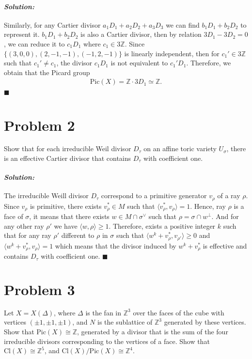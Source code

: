 \documentclass[12pt, a4paper]{article}
\newenvironment{solution}
  {\paragraph{\textit{Solution:}}\par\medskip}
  {\hfill$\blacksquare$\vspace{0.1cm}}
\begin{document}
\begin{solution}
Similarly, for any Cartier divisor $a_1D_1+a_2D_2+a_3D_3$ we can find $b_1D_1+b_2D_2$ to represent it.
$b_1D_1+b_2D_2$ is also a Cartier divisor, then by relation $3D_1-3D_2=0$, we can reduce it to $c_1D_1$ where $c_1\in 3\mathbb{Z}$.
Since $\{(3,0,0),(2,-1,-1),(-1,2,-1)\}$ is linearly independent, then for $c_1'\in 3\mathbb{Z}$ such that $c_1'\neq c_1$, the divisor $c_1D_1$ is not equivalent to 
$c_1'D_1$. Therefore, we obtain that the Picard group 
\begin{align*}
    \text{Pic}(X) =\mathbb{Z} \cdot 3D_1 \simeq \mathbb{Z}.
\end{align*}
\end{solution}


\section*{Problem 2}
Show that for each irreducible Weil divisor $D_\tau$ on an affine toric variety $U_\sigma$, there is an effective Cartier divisor that contains $D_\tau$ with coefficient one.
\begin{solution}
    The irreducible Weill divisor $D_\tau$ correspond to a primitive generator $v_\rho$ of a ray $\rho$.
    Since $v_\rho$ is primitive, there exists $v_\rho^*\in M$ such that $\langle v_\rho^*,v_\rho \rangle=1$.
    Hence, ray $\rho$ is a face of $\sigma$, it means that there exists $w\in M\cap \sigma^\vee$ such that $\rho = \sigma\cap w^{\perp}$.
    And for any other ray $\rho'$ we have $\langle w,\rho \rangle\ge 1$. Therefore, exists a positive integer $k$ such that for any ray $\rho'$ different to $\rho$ in $\sigma$ such that $\langle w^k+v_\rho^*,v_{\rho'} \rangle\ge 0$ 
    and $\langle w^k+v_\rho^*,v_{\rho} \rangle = 1$ which means that the divisor induced by $w^k+v_\rho^*$ is effective and contains $D_\tau$ with coefficient one.
\end{solution}




\section*{Problem 3}
Let $X = X(\Delta)$, where $\Delta$ is the fan in $\mathbb{Z}^3$ over the faces of the cube with vertices $(\pm 1, \pm 1, \pm 1)$, and $N$ is the sublattice of $\mathbb{Z}^3$ generated by these vertices.
Show that $\text{Pic}(X) \cong \mathbb{Z}$, generated by a divisor that is the sum of the four irreducible divisors corresponding to the vertices of a face. Show that $\text{Cl}(X) \cong \mathbb{Z}^5$, and $\text{Cl}(X)/\text{Pic}(X) \cong \mathbb{Z}^4$.
\end{document}
